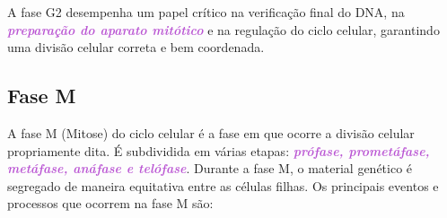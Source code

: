 \documentclass[11pt,a4paper]{article}
\begin{document}
	A fase G2 desempenha um papel crítico na verificação final do DNA, na \textcolor{MediumOrchid}{\textbf{\textit{preparação do aparato mitótico}}} e na regulação do ciclo celular, garantindo uma divisão celular correta e bem coordenada.

\subsection*{Fase M}

	A fase M (Mitose) do ciclo celular é a fase em que ocorre a divisão celular propriamente dita. É subdividida em várias etapas: \textcolor{MediumOrchid}{\textbf{\textit{prófase, prometáfase, metáfase, anáfase e telófase}}}. Durante a fase M, o material genético é segregado de maneira equitativa entre as células filhas. Os principais eventos e processos que ocorrem na fase M são:
\end{document}

